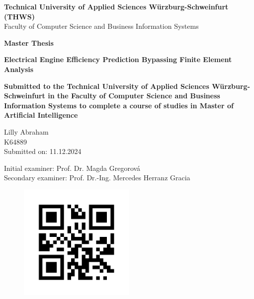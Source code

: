 \documentclass{report} %
\begin{document}
\begin{titlepage}
    \centering
    \vspace*{1cm}
    
    \Large \textbf{Technical University of Applied Sciences Würzburg-Schweinfurt (THWS)}\\
    \vspace{0.5cm}
    \Large Faculty of Computer Science and Business Information Systems\\
    \vspace{1cm}
    
    \huge \textbf{Master Thesis}\\
    \vspace{1.5cm}
    
    \Huge \textbf{Electrical Engine Efficiency Prediction Bypassing Finite Element Analysis}\\
    \vspace{2cm}
    
    \large \textbf{Submitted to the Technical University of Applied Sciences Würzburg-Schweinfurt in the Faculty of Computer Science and Business Information Systems to
    complete a course of studies in Master of Artificial Intelligence}
    
    \vspace{1cm}
    
    \huge Lilly Abraham\\
    \huge K64889\\
    \vspace{1cm}
    \large Submitted on: 11.12.2024\\
    
    \vfill
    
    \large
    Initial examiner: Prof. Dr. Magda Gregorová\\
    Secondary examiner: Prof. Dr.-Ing. Mercedes Herranz Gracia\\

\end{titlepage}

\newpage 
\begin{figure}[h]
    \centering
    \includegraphics[width=0.5\textwidth]{./ReportImages/qrcode.png} 
    \label{fig:qrcode}
\end{figure}
\end{document}
